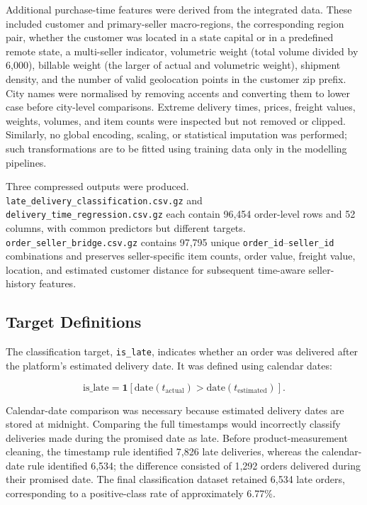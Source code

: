 Additional purchase-time features were derived from the integrated data. These included customer and primary-seller macro-regions, the corresponding region pair, whether the customer was located in a state capital or in a predefined remote state, a multi-seller indicator, volumetric weight (total volume divided by 6,000), billable weight (the larger of actual and volumetric weight), shipment density, and the number of valid geolocation points in the customer zip prefix. City names were normalised by removing accents and converting them to lower case before city-level comparisons. Extreme delivery times, prices, freight values, weights, volumes, and item counts were inspected but not removed or clipped. Similarly, no global encoding, scaling, or statistical imputation was performed; such transformations are to be fitted using training data only in the modelling pipelines.

Three compressed outputs were produced. \texttt{late\_delivery\_classification.csv.gz} and \texttt{delivery\_time\_regression.csv.gz} each contain 96,454 order-level rows and 52 columns, with common predictors but different targets. \texttt{order\_seller\_bridge.csv.gz} contains 97,795 unique \texttt{order\_id}--\texttt{seller\_id} combinations and preserves seller-specific item counts, order value, freight value, location, and estimated customer distance for subsequent time-aware seller-history features.

\subsection{Target Definitions}

The classification target, \texttt{is\_late}, indicates whether an order was delivered after the platform's estimated delivery date. It was defined using calendar dates:

\begin{equation}
\mathrm{is\_late} =
\mathbf{1}\!\left[
\mathrm{date}(t_{\mathrm{actual}}) >
\mathrm{date}(t_{\mathrm{estimated}})
\right].
\end{equation}

Calendar-date comparison was necessary because estimated delivery dates are stored at midnight. Comparing the full timestamps would incorrectly classify deliveries made during the promised date as late. Before product-measurement cleaning, the timestamp rule identified 7,826 late deliveries, whereas the calendar-date rule identified 6,534; the difference consisted of 1,292 orders delivered during their promised date. The final classification dataset retained 6,534 late orders, corresponding to a positive-class rate of approximately 6.77\%.

